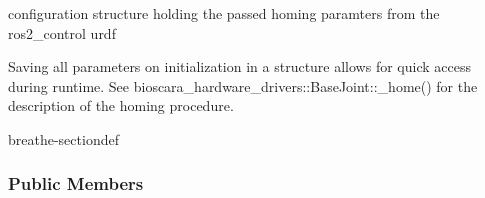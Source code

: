 \documentclass[letterpaper,10pt,english]{sphinxmanual}
\begin{document}
\begin{fulllineitems}
\begin{fulllineitems}
\label{\detokenize{code/bioscara_hardware_interfaces/index:_CPPv4N28bioscara_hardware_interfaces28bioscara_hardware_interfaces28BioscaraArmHardwareInterface21joint_homing_config_tE}}\label{\detokenize{code/bioscara_hardware_interfaces/index:_CPPv3N28bioscara_hardware_interfaces28bioscara_hardware_interfaces28BioscaraArmHardwareInterface21joint_homing_config_tE}}\label{\detokenize{code/bioscara_hardware_interfaces/index:_CPPv2N28bioscara_hardware_interfaces28bioscara_hardware_interfaces28BioscaraArmHardwareInterface21joint_homing_config_tE}}\label{\detokenize{code/bioscara_hardware_interfaces/index:bioscara_hardware_interfaces::bioscara_hardware_interfaces::BioscaraArmHardwareInterface::joint_homing_config_t}}
\pysigstartsignatures
\pysigstartmultiline
\pysigline
{\label{\detokenize{code/bioscara_hardware_interfaces/index:structbioscara__hardware__interfaces_1_1BioscaraArmHardwareInterface_1_1joint__homing__config__t}}}
\pysigstopmultiline
\pysigstopsignatures
\sphinxAtStartPar
configuration structure holding the passed homing paramters from the ros2\_control urdf 

\sphinxAtStartPar
Saving all parameters on initialization in a structure allows for quick access during runtime. See bioscara\_hardware\_drivers::BaseJoint::\_home() for the description of the homing procedure. 

\begin{sphinxuseclass}{breathe-sectiondef}\subsubsection*{Public Members}


\end{sphinxuseclass}
\end{fulllineitems}
\end{fulllineitems}
\end{document}
